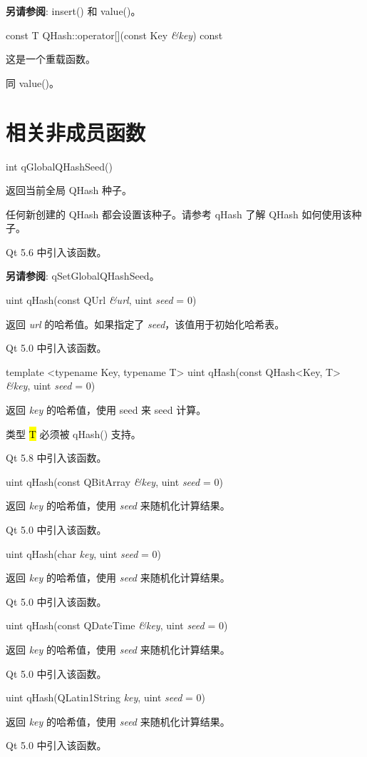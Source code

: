 \textbf{另请参阅}: insert() 和 value()。

const T QHash::operator[](const Key \emph{\&key}) const

这是一个重载函数。

同 value()。

\section{相关非成员函数}

int qGlobalQHashSeed()

返回当前全局 QHash 种子。

任何新创建的 QHash 都会设置该种子。请参考 qHash 了解 QHash 如何使用该种子。

Qt 5.6 中引入该函数。

\textbf{另请参阅}: qSetGlobalQHashSeed。

uint qHash(const QUrl \emph{\&url}, uint \emph{seed} = 0)

返回 \emph{url} 的哈希值。如果指定了 \emph{seed}，该值用于初始化哈希表。

Qt 5.0 中引入该函数。

template <typename Key, typename T> uint qHash(const QHash<Key, T> \emph{\&key}, uint \emph{seed} = 0)

返回 \emph{key} 的哈希值，使用 seed 来 seed 计算。

类型 \hl{T} 必须被 qHash() 支持。

Qt 5.8 中引入该函数。

uint qHash(const QBitArray \emph{\&key}, uint \emph{seed} = 0)

返回 \emph{key} 的哈希值，使用 \emph{seed} 来随机化计算结果。

Qt 5.0 中引入该函数。

uint qHash(char \emph{key}, uint \emph{seed} = 0)

返回 \emph{key} 的哈希值，使用 \emph{seed} 来随机化计算结果。

Qt 5.0 中引入该函数。

uint qHash(const QDateTime \emph{\&key}, uint \emph{seed} = 0)

返回 \emph{key} 的哈希值，使用 \emph{seed} 来随机化计算结果。

Qt 5.0 中引入该函数。

uint qHash(QLatin1String \emph{key}, uint \emph{seed} = 0)

返回 \emph{key} 的哈希值，使用 \emph{seed} 来随机化计算结果。

Qt 5.0 中引入该函数。

